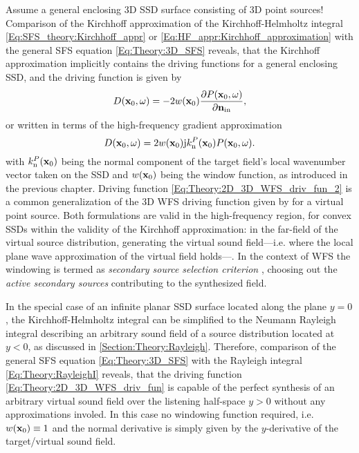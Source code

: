 Assume a general enclosing 3D SSD surface consisting of 3D point sources!
Comparison of the Kirchhoff approximation of the Kirchhoff-Helmholtz integral \ref{Eq:SFS_theory:Kirchhoff_appr} or \eqref{Eq:HF_appr:Kirchhoff_approximation} with the general SFS equation \eqref{Eq:Theory:3D_SFS} reveals, that the Kirchhoff approximation implicitly contains the driving functions for a general enclosing SSD, and the driving function is given by
\begin{equation}
D(\mathbf{x}_0,\omega) = - 2w(\mathbf{x}_0)\frac{\partial P(\mathbf{x}_0,\omega)}{\partial \mathbf{n}_{\mathrm{in}}}, 
\label{Eq:Theory:2D_3D_WFS_driv_fun}
\end{equation}
or written in terms of the high-frequency gradient approximation
\begin{equation}
D(\mathbf{x}_0,\omega) = 2 w(\mathbf{x}_0) \mathrm{j} k_{\mathrm{n}}^P(\mathbf{x}_0) P(\mathbf{x}_0,\omega).
\label{Eq:Theory:2D_3D_WFS_driv_fun_2}
\end{equation}
with $k_{\mathrm{n}}^P(\mathbf{x}_0)$ being the normal component of the target field's local wavenumber vector taken on the SSD and $w(\mathbf{x}_0)$ being the window function, as introduced in the previous chapter.
Driving function \eqref{Eq:Theory:2D_3D_WFS_driv_fun_2} is a common generalization of the 3D WFS driving function given by \cite[Eq. 20.]{Zotter2013:uniqueness} for a virtual point source.
Both formulations are valid in the high-frequency region, for convex SSDs within the validity of the Kirchhoff approximation: in the far-field of the virtual source distribution, generating the virtual sound field---i.e. where the local plane wave approximation of the virtual field holds---. %
In the context of WFS the windowing is termed as \emph{secondary source selection criterion} \cite{Spors2007, Spors2007:DAGA:SS_selection_criterion}, choosing out the \emph{active secondary sources} contributing to the synthesized field. 

\vspace{3mm}
In the special case of an infinite planar SSD surface located along the plane $y = 0$, the Kirchhoff-Helmholtz integral can be simplified to the Neumann Rayleigh integral describing an arbitrary sound field of a source distribution located at $y<0$, as discussed in \ref{Section:Theory:Rayleigh}.
Therefore, comparison of the general SFS equation \eqref{Eq:Theory:3D_SFS} with the Rayleigh integral \eqref{Eq:Theory:RayleighI} reveals, that the driving function \eqref{Eq:Theory:2D_3D_WFS_driv_fun} is capable of the perfect synthesis of an arbitrary virtual sound field over the listening half-space $y>0$ without any approximations involed.
In this case no windowing function required, i.e. $w(\mathbf{x}_0) \equiv 1$ and the normal derivative is simply given by the $y$-derivative of the target/virtual sound field.

